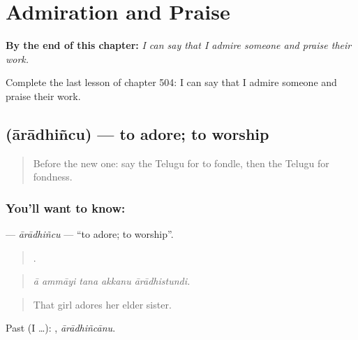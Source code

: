 
\chapter{Admiration and Praise}
\label{ch:te-admiration-and-praise}

\begin{chapteropening}
\textbf{By the end of this chapter:} \emph{I can say that I admire someone and praise their work.}

Complete the last lesson of chapter 504: I can say that I admire someone and praise their work.
\end{chapteropening}

\section[\texorpdfstring{\te{ఆరాధించు} (ārādhiñcu)}{ఆరాధించు (ārādhiñcu)}]{ (ārādhiñcu) — to adore; to worship}

\label{lesson:TE-C504-aradhincu}



\begin{quote}
Before the new one: say the Telugu for to fondle, then the Telugu for fondness.
\end{quote}

\subsection*{You'll want to know: }
\textbf{} — \emph{ārādhiñcu} — \textquotedblleft{}to adore; to worship\textquotedblright{}.

\begin{quote}
    .
\end{quote}

\begin{quote}
\emph{ā ammāyi tana akkanu ārādhistundi.}
\end{quote}

\begin{quote}
That girl adores her elder sister.
\end{quote}

Past (I …): , \emph{ārādhiñcānu}.

